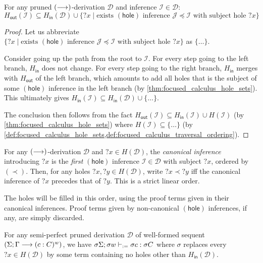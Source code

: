 \documentclass[twoside]{report}
\begin{document}
\begin{proposition}
\label{thm:focused_calculus_traversal_ordering}
For any pruned $(\longrightarrow)$-derivation $\mathcal D$ and inference $\mathcal I \in \mathcal D$:
$$
H_{\mathsf{out}}(\mathcal I) \subseteq H_{\mathsf{in}}(\mathcal D) \cup \{{?x} \mid \text{exists $(\mathsf{hole})$ inference $\mathcal J \preceq \mathcal I$ with subject hole } {?x}\}
$$
\end{proposition}

\begin{proof}
Let us abbreviate $\{{?x} \mid \text{exists $(\mathsf{hole})$ inference $\mathcal J \preceq \mathcal I$ with subject hole } {?x}\}$ as $\{\ldots\}$.

Consider going up the path from the root to $\mathcal I$. For every step going to the left branch, $H_{\mathsf{in}}$ does not change. For every step going to the right branch, $H_{\mathsf{in}}$ merges with $H_{\mathsf{out}}$ of the left branch, which amounts to add all holes that is the subject of some $(\mathsf{hole})$ inference in the left branch (by \cref{thm:focused_calculus_hole_sets}). This ultimately gives $H_{\mathsf{in}}(\mathcal I) \subseteq H_{\mathsf{in}}(\mathcal D) \cup \{\ldots\}$.

The conclusion then follows from the fact $H_{\mathsf{out}}(\mathcal I) \subseteq H_{\mathsf{in}}(\mathcal I) \cup H(\mathcal I)$ (by \cref{thm:focused_calculus_hole_sets}) where $H(\mathcal I) \subseteq \{\ldots\}$ (by \cref{def:focused_calculus_hole_sets,def:focused_calculus_traversal_ordering}).
\end{proof}

\begin{definition}
\label{def:focused_calculus_hole_ordering}
For any $(\longrightarrow)$-derivation $\mathcal D$ and ${?x} \in H(\mathcal D)$, the \emph{canonical inference} introducing ${?x}$ is the \emph{first} $(\mathsf{hole})$ inference $\mathcal I \in \mathcal D$ with subject ${?x}$, ordered by $(\prec)$. Then, for any holes ${?x}, {?y} \in H(\mathcal D)$, write ${?x} \prec {?y}$ iff the canonical inference of ${?x}$ precedes that of ${?y}$. This is a strict linear order.
\end{definition}

The holes will be filled in this order, using the proof terms given in their canonical inferences. Proof terms given by non-canonical $(\mathsf{hole})$ inferences, if any, are simply discarded.

\begin{proposition}
\label{thm:focused_calculus_semi_perfect_term_assignment}
For any semi-perfect pruned derivation $\mathcal D$ of well-formed sequent $(\Sigma; \Gamma \longrightarrow (c : C)^w)$, we have $\sigma \Sigma; \sigma w \vdash_{:=} \sigma c : \sigma C$ where $\sigma$ replaces every ${?x} \in H(\mathcal D)$ by some term containing no holes other than $H_{\mathsf{in}}(\mathcal D)$.
\end{proposition}
\end{document}
